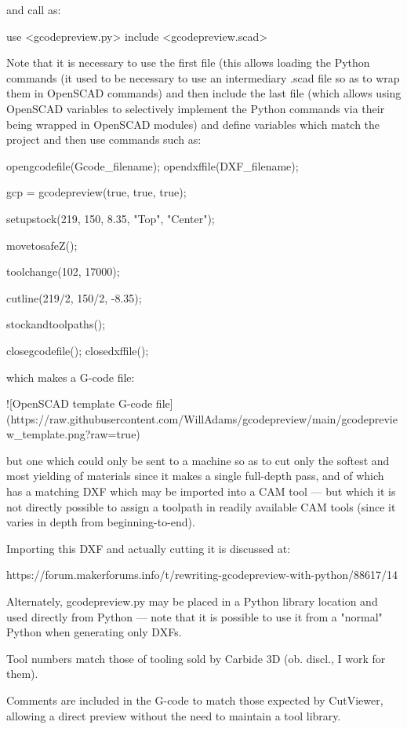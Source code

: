 \documentclass{ltxdoc}
\begin{document}
\begin{readme}
and call as:

    use <gcodepreview.py>
    include <gcodepreview.scad>

Note that it is necessary to use the first file (this allows loading the Python commands (it used to be necessary to use an intermediary .scad file so as to wrap them in OpenSCAD commands) and then include the last file (which allows using OpenSCAD variables to selectively implement the Python commands via their being wrapped in OpenSCAD modules) and define variables which match the project and then use commands such as:

    opengcodefile(Gcode_filename);
    opendxffile(DXF_filename);
    
    gcp = gcodepreview(true, true, true);

    setupstock(219, 150, 8.35, "Top", "Center");
    
    movetosafeZ();
    
    toolchange(102, 17000);
    
    cutline(219/2, 150/2, -8.35);

    stockandtoolpaths();
    
    closegcodefile();
    closedxffile();

which makes a G-code file:

![OpenSCAD template G-code file](https://raw.githubusercontent.com/WillAdams/gcodepreview/main/gcodepreview_template.png?raw=true)

but one which could only be sent to a machine so as to cut only the softest and most yielding of materials since it makes a single full-depth pass, and of which has a matching DXF which may be imported into a CAM tool --- but which it is not directly possible to assign a toolpath in readily available CAM tools (since it varies in depth from beginning-to-end). 

Importing this DXF and actually cutting it is discussed at:

https://forum.makerforums.info/t/rewriting-gcodepreview-with-python/88617/14

Alternately, gcodepreview.py may be placed in a Python library location and used directly from Python --- note that it is possible to use it from a "normal" Python when generating only DXFs.

Tool numbers match those of tooling sold by Carbide 3D (ob. discl., I work for them). 

Comments are included in the G-code to match those expected by CutViewer, allowing a direct preview without the need to maintain a tool library.


\end{readme}
\end{document}
